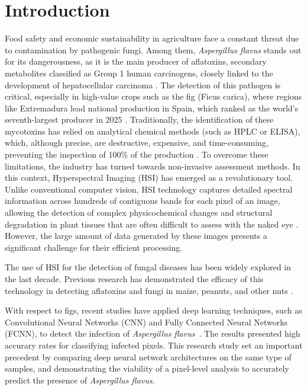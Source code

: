 \documentclass[runningheads]{llncs}
\begin{document}
\section{Introduction}
Food safety and economic sustainability in agriculture face a constant threat due to contamination by pathogenic fungi. 
Among them, \textit{Aspergillus flavus} stands out for its dangerousness, as it is the main producer of aflatoxins, secondary metabolites classified as Group 1 human carcinogens, closely linked to the development of hepatocellular carcinoma \cite{cruz-carrasco_detection_2024}. 
The detection of this pathogen is critical, especially in high-value crops such as the fig (Ficus carica), where regions like Extremadura lead national production in Spain, which ranked as the world's seventh-largest producer in 2025 \cite{fao_fao_2025}. 
Traditionally, the identification of these mycotoxins has relied on analytical chemical methods (such as HPLC or ELISA), which, although precise, are destructive, expensive, and time-consuming, preventing the inspection of 100\% of the production \cite{chu_classifying_2020, park_hyperspectral_2015}. 
To overcome these limitations, the industry has turned towards non-invasive assessment methods. 
In this context, Hyperspectral Imaging (HSI) has emerged as a revolutionary tool. 
Unlike conventional computer vision, HSI technology captures detailed spectral information across hundreds of contiguous bands for each pixel of an image, allowing the detection of complex physicochemical changes and structural degradation in plant tissues that are often difficult to assess with the naked eye \cite{wang_review_2021, chu_classifying_2020}. 
However, the large amount of data generated by these images presents a significant challenge for their efficient processing.

The use of HSI for the detection of fungal diseases has been widely explored in the last decade. 
Previous research has demonstrated the efficacy of this technology in detecting aflatoxins and fungi in maize, peanuts, and other nuts \cite{park_hyperspectral_2015, cruz-carrasco_detection_2024}. 

With respect to figs, recent studies have applied deep learning techniques, such as Convolutional Neural Networks (CNN) and Fully Connected Neural Networks (FCNN), to detect the infection of \textit{Aspergillus flavus}~\cite{cruz-carrasco_detection_2024}. The results presented high accurary rates for classifying infected pixels. This research study set an important precedent by comparing deep neural network architectures on the same type of samples, and demonstrating the viability of a pixel-level analysis to accurately predict the presence of \textit{Aspergillus flavus}.
\end{document}
